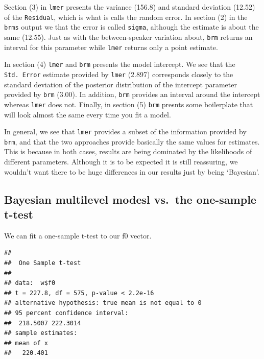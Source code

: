 \documentclass[
]{book}
\newenvironment{Shaded}{\begin{snugshade}}{\end{snugshade}}
\newcommand{\FunctionTok}[1]{\textcolor[rgb]{0.00,0.00,0.00}{#1}}
\newcommand{\NormalTok}[1]{#1}
\newcommand{\SpecialCharTok}[1]{\textcolor[rgb]{0.00,0.00,0.00}{#1}}
\begin{document}
Section (3) in \texttt{lmer} presents the variance (156.8) and standard deviation (12.52) of the \texttt{Residual}, which is what is calls the random error. In section (2) in the \texttt{brms} output we that the error is called \texttt{sigma}, although the estimate is about the same (12.55). Just as with the between-speaker variation about, \texttt{brm} returns an interval for this parameter while \texttt{lmer} returns only a point estimate.

In section (4) \texttt{lmer} and \texttt{brm} presents the model intercept. We see that the \texttt{Std.\ Error} estimate provided by \texttt{lmer} (2.897) corresponds closely to the standard deviation of the posterior distribution of the intercept parameter provided by \texttt{brm} (3.00). In addition, \texttt{brm} provides an interval around the intercept whereas \texttt{lmer} does not. Finally, in section (5) \texttt{brm} presnts some boilerplate that will look almost the same every time you fit a model.

In general, we see that \texttt{lmer} provides a subset of the information provided by \texttt{brm}, and that the two approaches provide basically the same values for estimates. This is because in both cases, results are being dominated by the likelihoods of different parameters. Although it is to be expected it is still reassuring, we wouldn't want there to be huge differences in our results just by being `Bayesian'.

\hypertarget{bayesian-multilevel-modesl-vs.-the-one-sample-t-test}{%
\subsection{Bayesian multilevel modesl vs.~the one-sample t-test}\label{bayesian-multilevel-modesl-vs.-the-one-sample-t-test}}

We can fit a one-sample t-test to our f0 vector.

\begin{Shaded}
\end{Shaded}

\begin{verbatim}
## 
##  One Sample t-test
## 
## data:  w$f0
## t = 227.8, df = 575, p-value < 2.2e-16
## alternative hypothesis: true mean is not equal to 0
## 95 percent confidence interval:
##  218.5007 222.3014
## sample estimates:
## mean of x 
##   220.401
\end{verbatim}
\end{document}
